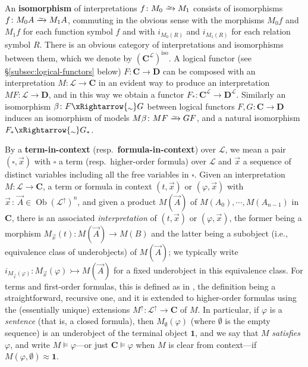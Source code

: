 \documentclass{amsart}
\newcommand\bC{\mathbf{C}}
\newcommand\bD{\mathbf{D}}
\newcommand\cL{\mathcal{L}}
\newcommand\defword[1]{{\boldmath \textbf{#1}}}
\newcommand\iso{\mathrm{iso}}
\newcommand\Ob{\operatorname{Ob}}
\renewcommand\phi{\varphi}
\newcommand\tm{\mathbf{1}}
\newcommand\Toi{\xRightarrow{\raisebox{-1.5pt}[0pt][0pt]{\ensuremath{\scriptstyle{\sim}}}}}
\newcommand\toi{\xrightarrow{\raisebox{-2.5pt}[0pt][0pt]{\ensuremath{\scriptstyle{\sim}}}}}
\newcommand\tolon{{\,:\,}}
\newcommand\tto{\rightarrowtail}
\newcommand\up{\uparrow}
\newcommand\vA{\vek{A}}
\newcommand\vek[1]{{\vec{#1}}}
\newcommand\vx{\vek{x}}
\newcommand\prerefpost[3]{%
  \texorpdfstring%
    {\hyperref[#2]{#1\ref*{#2}#3}}%
    {#1\ref*{#2}#3}%
}
\newcommand\sref[1]{\prerefpost{\S}{#1}{}}
\theoremstyle{definition}
\theoremstyle{remark}
\theoremstyle{plainwithref}
\begin{document}
An \defword{isomorphism} of interpretations \( f \colon M_0 \toi M_1 \) consists of isomorphisms \( f \colon M_0 A \toi M_1 A \), commuting in the obvious sense with the morphisms \( M_0 f \) and \( M_1 f \) for each function symbol \( f \) and with \( i_{M_0(R)} \) and \( i_{M_1(R)} \) for each relation symbol \( R \).
There is an obvious category of interpretations and isomorphisms between them, which we denote by \( (\bC^\cL)^\iso \).
A logical functor (see \sref{subsec:logical-functors} below) \( F \colon \bC \to \bD \) can be composed with an interpretation \( M \colon \cL \to \bC \) in an evident way to produce an interpretation \( M F \colon \cL \to \bD \), and in this way we obtain a functor \( F_* \colon \bC^\cL \to \bD^\cL \).
Similarly an isomorphism \( \beta \colon F \Toi G \) between logical functors \( F,G \colon \bC \to \bD \) induces an isomorphism of models \( M \beta \colon M F \toi G F \), and a natural isomorphism \( F_* \Toi G_* \).

By a \defword{term-in-context} (resp.\ \defword{formula-in-context}) over \( \cL \), we mean a pair \( (\square, \vx) \) with \( \square \) a term (resp.\ higher-order formula) over \( \cL \) and \( \vx \) a sequence of distinct variables including all the free variables in \( \square \).
Given an interpretation \( M \colon \cL \to \bC \), a term or formula in context \( (t, \vx) \) or \( (\phi, \vx) \) with \( \vx \tolon \vA \in \Ob (\cL^\up)^n \), and given a product \( M(\vA) \) of \( M(A_0),\cdots,M(A_{n-1}) \) in \( \bC \), there is an associated \emph{interpretation} of \( (t, \vx) \) or \( (\phi, \vx) \), the former being a morphism \( M_{\vx}(t) \colon M(\vA) \to M(B) \) and the latter being a subobject (i.e., equivalence class of underobjects) of \( M(\vA) \); we typically write \( i_{M_{\vx}(\phi)} \colon M_{\vx}(\phi) \tto M(\vA) \) for a fixed underobject in this equivalence class.
For terms and first-order formulas, this is defined as in \cite{makkai-reyes-focl}, the definition being a straightforward, recursive one, and it is extended to higher-order formulas using the (essentially unique) extensions \( M^\up \colon \cL^\up \to \bC \) of \( M \).
In particular, if \( \phi \) is a \emph{sentence} (that is, a closed formula), then \( M_{\emptyset}(\phi) \) (where \( \emptyset \) is the empty sequence) is an underobject of the terminal object \( \tm \), and we say that \( M \) \emph{satisfies} \( \phi \), and write \( M \vDash \phi \)---or just \( \bC \vDash \phi \) when \( M \) is clear from context---if \( M(\phi, \emptyset) \approx \tm \).
\end{document}
